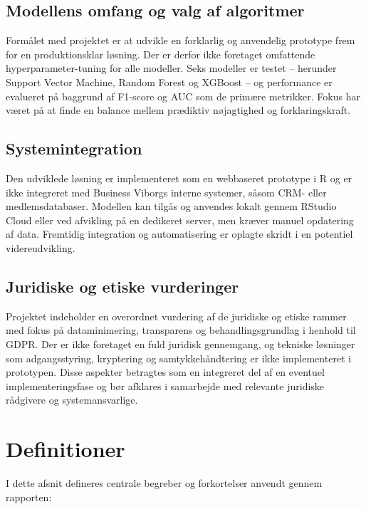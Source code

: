 \documentclass[
  11pt,
  letterpaper,
  DIV=11,
  numbers=noendperiod]{scrartcl}
\begin{document}
\subsection{Modellens omfang og valg af
algoritmer}\label{modellens-omfang-og-valg-af-algoritmer}

Formålet med projektet er at udvikle en forklarlig og anvendelig
prototype frem for en produktionsklar løsning. Der er derfor ikke
foretaget omfattende hyperparameter-tuning for alle modeller. Seks
modeller er testet -- herunder Support Vector Machine, Random Forest og
XGBoost -- og performance er evalueret på baggrund af F1-score og AUC
som de primære metrikker. Fokus har været på at finde en balance mellem
prædiktiv nøjagtighed og forklaringskraft.

\subsection{Systemintegration}\label{systemintegration}

Den udviklede løsning er implementeret som en webbaseret prototype i R
og er ikke integreret med Business Viborgs interne systemer, såsom CRM-
eller medlemsdatabaser. Modellen kan tilgås og anvendes lokalt gennem
RStudio Cloud eller ved afvikling på en dedikeret server, men kræver
manuel opdatering af data. Fremtidig integration og automatisering er
oplagte skridt i en potentiel videreudvikling.

\subsection{Juridiske og etiske
vurderinger}\label{juridiske-og-etiske-vurderinger}

Projektet indeholder en overordnet vurdering af de juridiske og etiske
rammer med fokus på dataminimering, transparens og behandlingsgrundlag i
henhold til GDPR. Der er ikke foretaget en fuld juridisk gennemgang, og
tekniske løsninger som adgangsstyring, kryptering og samtykkehåndtering
er ikke implementeret i prototypen. Disse aspekter betragtes som en
integreret del af en eventuel implementeringsfase og bør afklares i
samarbejde med relevante juridiske rådgivere og systemansvarlige.

\section{Definitioner}\label{definitioner}

I dette afsnit defineres centrale begreber og forkortelser anvendt
gennem rapporten:
\end{document}

